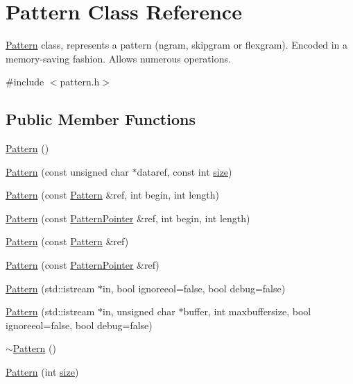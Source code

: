 \hypertarget{classPattern}{}\section{Pattern Class Reference}
\label{classPattern}


\hyperlink{classPattern}{Pattern} class, represents a pattern (ngram, skipgram or flexgram). Encoded in a memory-\/saving fashion. Allows numerous operations.  




{\ttfamily \#include $<$pattern.\+h$>$}

\subsection*{Public Member Functions}
\begin{DoxyCompactItemize}
\item 
\hyperlink{classPattern_a95f42b0f1717d9e6c2d831e87d27f83c}{Pattern} ()
\item 
\hyperlink{classPattern_a4b345a9704f37489492d769073abe964}{Pattern} (const unsigned char $\ast$dataref, const int \hyperlink{classPattern_a400a18c6a1b6de3eb574b6a0f12c9ca2}{size})
\item 
\hyperlink{classPattern_a4f080abb2e6bb11fea1b91a68c59f89b}{Pattern} (const \hyperlink{classPattern}{Pattern} \&ref, int begin, int length)
\item 
\hyperlink{classPattern_ad981fd3fe3723d68226c98c0a3891c13}{Pattern} (const \hyperlink{classPatternPointer}{Pattern\+Pointer} \&ref, int begin, int length)
\item 
\hyperlink{classPattern_a9b69825f6e0b1f741be370ac1cbd1b4d}{Pattern} (const \hyperlink{classPattern}{Pattern} \&ref)
\item 
\hyperlink{classPattern_a5731960d41f0f7ffa3e8b03bb519f8b5}{Pattern} (const \hyperlink{classPatternPointer}{Pattern\+Pointer} \&ref)
\item 
\hyperlink{classPattern_a94cb62534e311b8d78561e8e52780829}{Pattern} (std\+::istream $\ast$in, bool ignoreeol=false, bool debug=false)
\item 
\hyperlink{classPattern_a0a3103f6112a56d00a82bdd56cc55afb}{Pattern} (std\+::istream $\ast$in, unsigned char $\ast$buffer, int maxbuffersize, bool ignoreeol=false, bool debug=false)
\item 
\hyperlink{classPattern_a6e8b9388bbd39934e9f9534b974d7498}{$\sim$\+Pattern} ()
\item 
\hyperlink{classPattern_a80041c82ee57093f673677b22906bbf8}{Pattern} (int \hyperlink{classPattern_a400a18c6a1b6de3eb574b6a0f12c9ca2}{size})

\end{DoxyCompactItemize}
